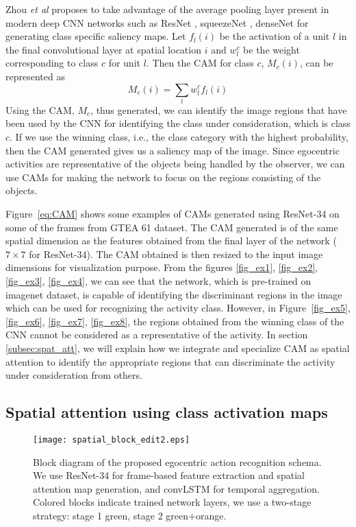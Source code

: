 \documentclass{bmvc2k}
\def\etal{\emph{et al}\bmvaOneDot}
\begin{document}
Zhou \etal \cite{zhou2016learning} proposes to take advantage of the average pooling layer present in modern deep CNN networks such as ResNet \cite{he2016deep}, squeezeNet \cite{iandola2016squeezenet}, denseNet \cite{huang2017densely} for generating class specific saliency maps. Let $f_l(i)$ be the activation of a unit $l$ in the final convolutional layer at spatial location $i$ and $w_l^c$ be the weight corresponding to class $c$ for unit $l$. Then the CAM for class $c$, $M_c(i)$, can be represented as
	\begin{equation}
	M_c(i) = \sum_{l}w_l^cf_l(i)
	\label{eq:CAM}
	\end{equation}
	Using the CAM, $M_c$, thus generated, we can identify the image regions that have been used by the CNN for identifying the class under consideration, which is class $c$. If we use the winning class, i.e., the class category with the highest probability, then the CAM generated gives us a saliency map of the image. Since egocentric activities are representative of the objects being handled by the observer, we can use CAMs for making the network to focus on the regions consisting of the objects.

Figure~\ref{eq:CAM} shows some examples of CAMs generated using ResNet-34 on some of the frames from GTEA 61 dataset. The CAM generated is of the same spatial dimension as the features obtained from the final layer of the network ($7\times 7$ for ResNet-34). The CAM obtained is then resized to the input image dimensions for visualization purpose. From the figures \ref{fig_ex1}, \ref{fig_ex2}, \ref{fig_ex3}, \ref{fig_ex4}, we can see that the network, which is pre-trained on imagenet dataset, is capable of identifying the discriminant regions in the image which can be used for recognizing the activity class. However, in Figure~\ref{fig_ex5}, \ref{fig_ex6}, \ref{fig_ex7}, \ref{fig_ex8}, the regions obtained from the winning class of the CNN cannot be considered as a representative of the activity. In section \ref{subsec:spat_att}, we will explain how we integrate and specialize CAM as spatial attention to identify the appropriate regions that can discriminate the activity under consideration from others.

\subsection{Spatial attention using class activation maps}


	 \begin{figure}[t]
		\centering
		\texttt{[image: spatial\_block\_edit2.eps]}
		\vspace*{2mm}
		\caption{Block diagram of the proposed egocentric action recognition schema. We use ResNet-34 for frame-based feature extraction and spatial attention map generation, and convLSTM for temporal aggregation. Colored blocks indicate trained network layers, we use a two-stage strategy: stage 1 green, stage 2 green+orange.
		}
		\label{fig:block_dia}
	\end{figure}
\end{document}
